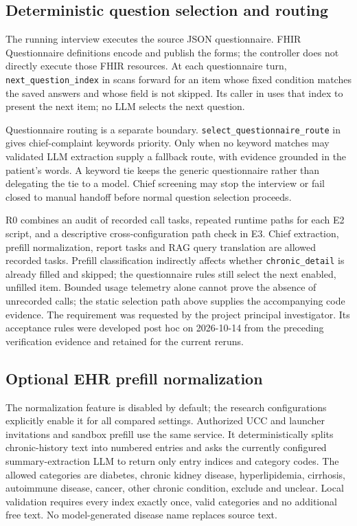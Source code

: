 \subsection{Deterministic question selection and routing}
The running interview executes the source JSON questionnaire. FHIR Questionnaire
definitions encode and publish the forms; the controller does not directly
execute those FHIR resources. At each questionnaire turn,
\texttt{next\_question\_index} in 
scans forward for an item whose fixed condition matches the saved answers and
whose field is not skipped. Its caller in 
uses that index to present the next item; no LLM selects the next question.

Questionnaire routing is a separate boundary.
\texttt{select\_questionnaire\_route} in
 gives chief-complaint keywords
priority. Only when no keyword matches may validated LLM extraction supply a
fallback route, with evidence grounded in the patient's words. A keyword tie
keeps the generic questionnaire rather than delegating the tie to a model.
Chief screening may stop the interview or fail closed to manual handoff before
normal question selection proceeds.

R0 combines an audit of recorded call tasks, repeated runtime paths for each
E2 script, and a descriptive cross-configuration path check in E3. Chief
extraction, prefill normalization, report tasks and RAG query translation are
allowed recorded tasks. Prefill classification indirectly affects whether
\texttt{chronic\_detail} is already filled and skipped; the questionnaire rules
still select the next enabled, unfilled item. Bounded usage telemetry alone cannot prove the absence of unrecorded
calls; the static selection path above supplies the accompanying code evidence.
The requirement was requested by the project principal investigator. Its
acceptance rules were developed post hoc on 2026-10-14 from the preceding
verification evidence and retained for the current reruns.

\subsection{Optional EHR prefill normalization}
The normalization feature is disabled by default; the research configurations
explicitly enable it for all compared settings. Authorized UCC and launcher
invitations and sandbox prefill use the same service. It deterministically splits
chronic-history text into numbered entries and asks the currently configured
summary-extraction LLM to return only entry indices and category codes. The
allowed categories are diabetes, chronic kidney disease, hyperlipidemia,
cirrhosis, autoimmune disease, cancer, other chronic condition, exclude and
unclear. Local validation requires every index exactly once, valid categories
and no additional free text. No model-generated disease name replaces source text.

